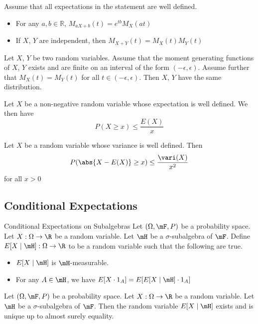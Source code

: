\documentclass[a4paper]{article}
\begin{document}
\begin{prp}{}{} Assume that all expectations in the statement are well defined. 
\begin{itemize}
\item For any $a,b\in\mathbb{R}$, $M_{aX+b}(t)=e^{tb}M_X(at)$
\item If $X$, $Y$ are independent, then $M_{X+Y}(t)=M_X(t)M_Y(t)$
\end{itemize}
\end{prp}

\begin{thm}{}{} Let $X$, $Y$ be two random variables. Assume that the moment generating functions of $X$, $Y$ exists and are finite on an interval of the form $(-\epsilon,\epsilon)$. Assume further that $M_X(t)=M_Y(t)$ for all $t\in(-\epsilon,\epsilon)$. Then $X$, $Y$ have the same distribution. 
\end{thm}

\begin{thm}{}{} Let $X$ be a non-negative random variable whose expectation is well defined. We then have $$P(X\geq x)\leq\frac{E(X)}{x}$$
\end{thm}

\begin{thm}{}{} Let $X$ be a random variable whose variance is well defined. Then $$P(\abs{X-E(X)}\geq x)\leq\frac{\vari(X)}{x^2}$$ for all $x>0$
\end{thm}

\subsection{Conditional Expectations}
\begin{defn}{Conditional Expectations on Subalgebras}{} Let $(\Omega,\mF,P)$ be a probability space. Let $X:\Omega\to\R$ be a random variable. Let $\mH$ be a $\sigma$-subalgebra of $\mF$. Define $E[X\;|\;\mH]:\Omega\to\R$ to be a random variable such that the following are true. 
\begin{itemize}
\item $E[X\;|\;\mH]$ is $\mH$-measurable. 
\item For any $A\in\mH$, we have $E[X\cdot 1_A]=E[E[X\;|\;\mH]\cdot 1_A]$
\end{itemize}
\end{defn}

\begin{lmm}{}{} Let $(\Omega,\mF,P)$ be a probability space. Let $X:\Omega\to\R$ be a random variable. Let $\mH$ be a $\sigma$-subalgebra of $\mF$. Then the random variable $E[X\;|\;\mH]$ exists and is unique up to almost surely equality. 
\end{lmm}
\end{document}
